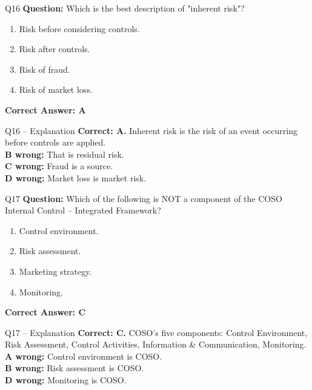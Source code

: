 \documentclass[aspectratio=169,10pt]{beamer}
\begin{document}
	\begin{frame}[t]{Q16}
		\small
		\textbf{Question:} Which is the best description of "inherent risk"?
		\begin{enumerate}[label=\Alph*.,itemsep=1pt,topsep=2pt]
			\item Risk before considering controls.
			\item Risk after controls.
			\item Risk of fraud.
			\item Risk of market loss.
		\end{enumerate}
		\vspace{4pt}
		\textbf{Correct Answer: A}
	\end{frame}
	
	\begin{frame}[t]{Q16 -- Explanation}
		\small
		\textbf{Correct: A.} Inherent risk is the risk of an event occurring before controls are applied. \\[4pt]
		\textbf{B wrong:} That is residual risk. \\[2pt]
		\textbf{C wrong:} Fraud is a source. \\[2pt]
		\textbf{D wrong:} Market loss is market risk.
	\end{frame}
	
	\begin{frame}[t]{Q17}
		\small
		\textbf{Question:} Which of the following is NOT a component of the COSO Internal Control -- Integrated Framework?
		\begin{enumerate}[label=\Alph*.,itemsep=1pt,topsep=2pt]
			\item Control environment.
			\item Risk assessment.
			\item Marketing strategy.
			\item Monitoring.
		\end{enumerate}
		\vspace{4pt}
		\textbf{Correct Answer: C}
	\end{frame}
	
	\begin{frame}[t]{Q17 -- Explanation}
		\small
		\textbf{Correct: C.} COSO's five components: Control Environment, Risk Assessment, Control Activities, Information \& Communication, Monitoring. \\[4pt]
		\textbf{A wrong:} Control environment is COSO. \\[2pt]
		\textbf{B wrong:} Risk assessment is COSO. \\[2pt]
		\textbf{D wrong:} Monitoring is COSO.
	\end{frame}
	
\end{document}
